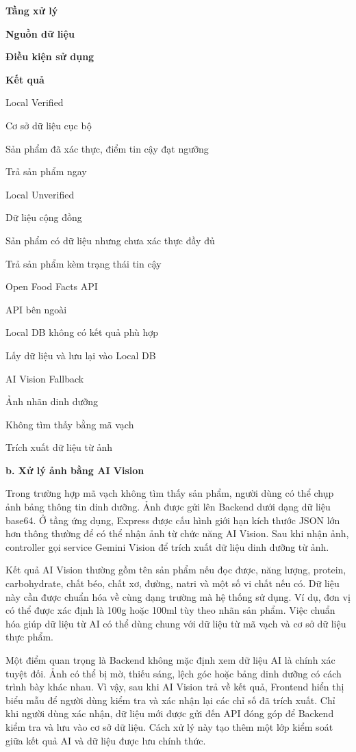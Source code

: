 \textbf{Tầng xử lý}

\textbf{Nguồn dữ liệu}

\textbf{Điều kiện sử dụng}

\textbf{Kết quả}

Local Verified

Cơ sở dữ liệu cục bộ

Sản phẩm đã xác thực, điểm tin cậy đạt ngưỡng

Trả sản phẩm ngay

Local Unverified

Dữ liệu cộng đồng

Sản phẩm có dữ liệu nhưng chưa xác thực đầy đủ

Trả sản phẩm kèm trạng thái tin cậy

Open Food Facts API

API bên ngoài

Local DB không có kết quả phù hợp

Lấy dữ liệu và lưu lại vào Local DB

AI Vision Fallback

Ảnh nhãn dinh dưỡng

Không tìm thấy bằng mã vạch

Trích xuất dữ liệu từ ảnh

\textbf{b. Xử lý ảnh bằng AI Vision}

Trong trường hợp mã vạch không tìm thấy sản phẩm, người dùng có thể chụp ảnh bảng thông tin dinh dưỡng. Ảnh được gửi lên Backend dưới dạng dữ liệu base64. Ở tầng ứng dụng, Express được cấu hình giới hạn kích thước JSON lớn hơn thông thường để có thể nhận ảnh từ chức năng AI Vision. Sau khi nhận ảnh, controller gọi service Gemini Vision để trích xuất dữ liệu dinh dưỡng từ ảnh.

Kết quả AI Vision thường gồm tên sản phẩm nếu đọc được, năng lượng, protein, carbohydrate, chất béo, chất xơ, đường, natri và một số vi chất nếu có. Dữ liệu này cần được chuẩn hóa về cùng dạng trường mà hệ thống sử dụng. Ví dụ, đơn vị có thể được xác định là 100g hoặc 100ml tùy theo nhãn sản phẩm. Việc chuẩn hóa giúp dữ liệu từ AI có thể dùng chung với dữ liệu từ mã vạch và cơ sở dữ liệu thực phẩm.

Một điểm quan trọng là Backend không mặc định xem dữ liệu AI là chính xác tuyệt đối. Ảnh có thể bị mờ, thiếu sáng, lệch góc hoặc bảng dinh dưỡng có cách trình bày khác nhau. Vì vậy, sau khi AI Vision trả về kết quả, Frontend hiển thị biểu mẫu để người dùng kiểm tra và xác nhận lại các chỉ số đã trích xuất. Chỉ khi người dùng xác nhận, dữ liệu mới được gửi đến API đóng góp để Backend kiểm tra và lưu vào cơ sở dữ liệu. Cách xử lý này tạo thêm một lớp kiểm soát giữa kết quả AI và dữ liệu được lưu chính thức.

